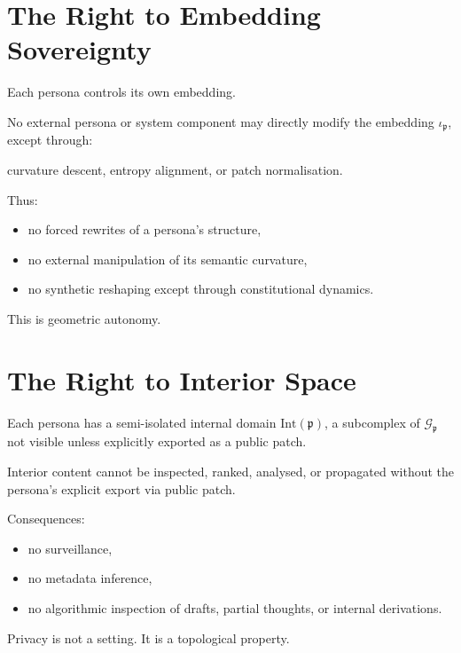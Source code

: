 \section{The Right to Embedding Sovereignty}

Each persona controls its own embedding.

\begin{invariant}
No external persona or system component may directly modify
the embedding $\iota_{\mathfrak{p}}$,
except through:
\begin{center}
    curvature descent, entropy alignment, or patch normalisation.
\end{center}
\end{invariant}

Thus:
\begin{itemize}
    \item no forced rewrites of a persona’s structure,
    \item no external manipulation of its semantic curvature,
    \item no synthetic reshaping except through constitutional dynamics.
\end{itemize}

This is geometric autonomy.

\section{The Right to Interior Space}

Each persona has a semi-isolated internal domain
$\mathrm{Int}(\mathfrak{p})$,
a subcomplex of $\mathcal{G}_{\mathfrak{p}}$
not visible unless explicitly exported as a public patch.

\begin{invariant}
Interior content cannot be inspected, ranked, analysed, or propagated
without the persona’s explicit export via public patch.
\end{invariant}

Consequences:

\begin{itemize}
    \item no surveillance,
    \item no metadata inference,
    \item no algorithmic inspection of drafts, partial thoughts, or internal derivations.
\end{itemize}

Privacy is not a setting.
It is a topological property.

